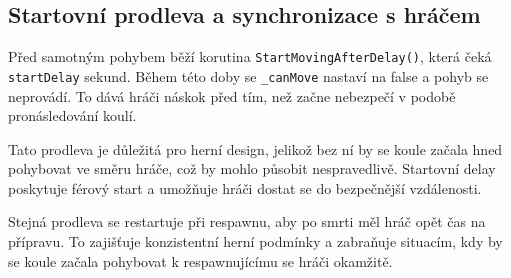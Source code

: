 \subsection{Startovní prodleva a synchronizace s hráčem}

Před samotným pohybem běží korutina \texttt{StartMovingAfterDelay()}, která čeká \texttt{startDelay} sekund. Během této doby se \texttt{\_canMove} nastaví na false a pohyb se neprovádí. To dává hráči náskok před tím, než začne nebezpečí v podobě pronásledování koulí.

Tato prodleva je důležitá pro herní design, jelikož bez ní by se koule začala hned pohybovat ve směru hráče, což by mohlo působit nespravedlivě. Startovní delay poskytuje férový start a umožňuje hráči dostat se do bezpečnější vzdálenosti.

Stejná prodleva se restartuje při respawnu, aby po smrti měl hráč opět čas na přípravu. To zajišťuje konzistentní herní podmínky a zabraňuje situacím, kdy by se koule začala pohybovat k respawnujícímu se hráči okamžitě.